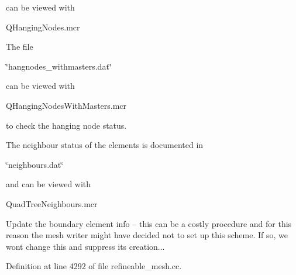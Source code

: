 can be viewed with
\begin{DoxyItemize}
\item Q\+Hanging\+Nodes.\+mcr
\end{DoxyItemize}
\begin{DoxyItemize}
\item The file
\begin{DoxyItemize}
\item \char`\"{}hangnodes\+\_\+withmasters.\+dat\char`\"{}
\end{DoxyItemize}can be viewed with
\begin{DoxyItemize}
\item Q\+Hanging\+Nodes\+With\+Masters.\+mcr
\end{DoxyItemize}to check the hanging node status.
\item The neighbour status of the elements is documented in
\begin{DoxyItemize}
\item \char`\"{}neighbours.\+dat\char`\"{}
\end{DoxyItemize}and can be viewed with
\begin{DoxyItemize}
\item Quad\+Tree\+Neighbours.\+mcr
\end{DoxyItemize}
\end{DoxyItemize}Update the boundary element info -- this can be a costly procedure and for this reason the mesh writer might have decided not to set up this scheme. If so, we won\textquotesingle{}t change this and suppress its creation... 

Definition at line 4292 of file refineable\+\_\+mesh.\+cc.



